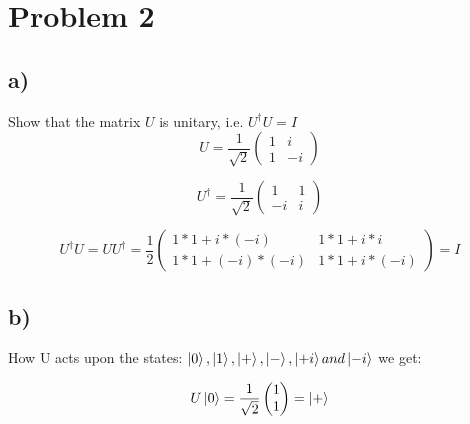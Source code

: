 \documentclass[11pt,a4paper]{article}
\begin{document}
\section*{Problem 2}
\subsection*{a)}
Show that the matrix $U$ is unitary, i.e. $U^\dagger U = I$
\begin{equation}
    U = \frac{1}{\sqrt{2}}
    \left(
    \begin{matrix}
        1&i \\
        1&-i
    \end{matrix}
    \right)
\end{equation}

\begin{equation}
    U^\dagger = \frac{1}{\sqrt{2}}
    \left(
    \begin{matrix}
        1 & 1 \\
        -i & i
    \end{matrix}
    \right)
\end{equation}

\begin{equation}
    U^\dagger U = UU^\dagger = \frac{1}{{2}}
    \left(
        \begin{matrix}
            1*1 + i*\left(-i\right) & 1*1 + i*i \\ 
            1*1 + \left(-i\right)*\left(-i\right) & 1*1 + i*\left(-i\right)
        \end{matrix}
    \right)
     = I
\end{equation}

\subsection*{b)}
How U acts upon the states: 
$\ket{0}, \ket{1}, \ket{+}, \ket{-}, \ket{+i} and \ket{-i}$
we get:


\begin{equation}
    U\ket{0} = \frac{1}{\sqrt{2}}
    \left(
        \begin{matrix}
            1\\1
        \end{matrix}
        \right)
        = \ket{+}
    \end{equation}
    
\end{document}
